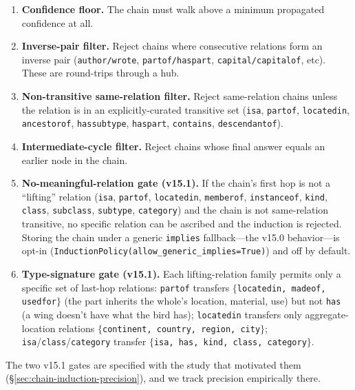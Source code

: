 \documentclass[11pt]{article}
\begin{document}
\begin{enumerate}
\item \textbf{Confidence floor.} The chain must walk above a minimum
      propagated confidence at all.
\item \textbf{Inverse-pair filter.} Reject chains where consecutive
      relations form an inverse pair (\texttt{author/wrote},
      \texttt{partof/haspart}, \texttt{capital/capitalof}, etc).
      These are round-trips through a hub.
\item \textbf{Non-transitive same-relation filter.} Reject same-relation
      chains unless the relation is in an explicitly-curated
      transitive set (\texttt{isa}, \texttt{partof}, \texttt{locatedin},
      \texttt{ancestorof}, \texttt{hassubtype}, \texttt{haspart},
      \texttt{contains}, \texttt{descendantof}).
\item \textbf{Intermediate-cycle filter.} Reject chains whose final
      answer equals an earlier node in the chain.
\item \textbf{No-meaningful-relation gate (v15.1).} If the chain's
      first hop is not a ``lifting'' relation (\texttt{isa},
      \texttt{partof}, \texttt{locatedin}, \texttt{memberof},
      \texttt{instanceof}, \texttt{kind}, \texttt{class},
      \texttt{subclass}, \texttt{subtype}, \texttt{category}) and the
      chain is not same-relation transitive, no specific relation can
      be ascribed and the induction is rejected. Storing the chain
      under a generic \texttt{implies} fallback---the v15.0
      behavior---is opt-in
      (\texttt{InductionPolicy(allow\_generic\_implies=True)}) and
      off by default.
\item \textbf{Type-signature gate (v15.1).} Each lifting-relation
      family permits only a specific set of last-hop relations:
      \texttt{partof} transfers
      $\{$\texttt{locatedin, madeof, usedfor}$\}$ (the part inherits
      the whole's location, material, use) but not \texttt{has} (a
      wing doesn't have what the bird has); \texttt{locatedin}
      transfers only aggregate-location relations
      $\{$\texttt{continent, country, region, city}$\}$;
      \texttt{isa}/\texttt{class}/\texttt{category} transfer
      $\{$\texttt{isa, has, kind, class, category}$\}$.
\end{enumerate}

The two v15.1 gates are specified with the study that motivated them
(\S\ref{sec:chain-induction-precision}), and we track precision
empirically there.
\end{document}
